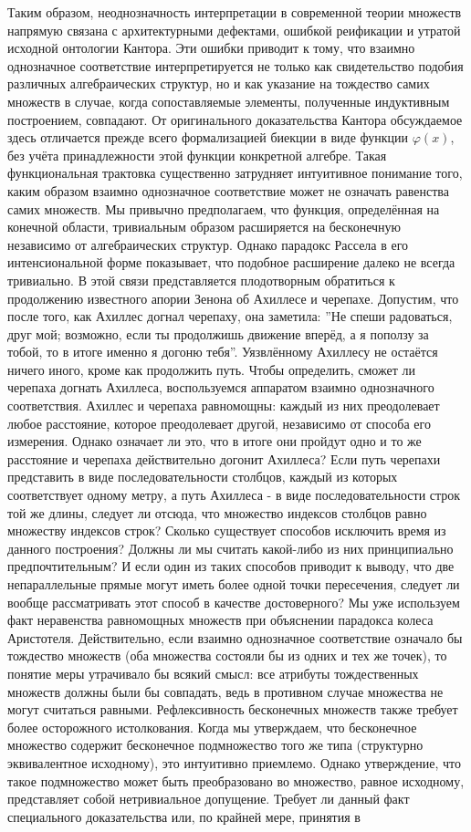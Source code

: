 \documentclass[12pt]{article}
\begin{document}
Таким образом, неоднозначность интерпретации в современной теории множеств напрямую связана с архитектурными дефектами, ошибкой реификации и утратой исходной онтологии Кантора. Эти ошибки приводит к тому, что взаимно однозначное соответствие интерпретируется не только как свидетельство подобия различных алгебраических структур, но и как указание на тождество самих множеств в случае, когда сопоставляемые элементы, полученные индуктивным построением, совпадают. От оригинального доказательства Кантора обсуждаемое здесь отличается прежде всего формализацией биекции в виде функции $\varphi(x)$, без учёта принадлежности этой функции конкретной алгебре. Такая функциональная трактовка существенно затрудняет интуитивное понимание того, каким образом взаимно однозначное соответствие может не означать равенства самих множеств. Мы привычно предполагаем, что функция, определённая на конечной области, тривиальным образом расширяется на бесконечную независимо от алгебраических структур. Однако парадокс Рассела в его интенсиональной форме показывает, что подобное расширение далеко не всегда тривиально. В этой связи представляется плодотворным обратиться к продолжению известного апории Зенона об Ахиллесе и черепахе. Допустим, что после того, как Ахиллес догнал черепаху, она заметила: ''Не спеши радоваться, друг мой; возможно, если ты продолжишь движение вперёд, а я поползу за тобой, то в итоге именно я догоню тебя''. Уязвлённому Ахиллесу не остаётся ничего иного, кроме как продолжить путь. Чтобы определить, сможет ли черепаха догнать Ахиллеса, воспользуемся аппаратом взаимно однозначного соответствия. Ахиллес и черепаха равномощны: каждый из них преодолевает любое расстояние, которое преодолевает другой, независимо от способа его измерения. Однако означает ли это, что в итоге они пройдут одно и то же расстояние и черепаха действительно догонит Ахиллеса? Если путь черепахи представить в виде последовательности столбцов, каждый из которых соответствует одному метру, а путь Ахиллеса - в виде последовательности строк той же длины, следует ли отсюда, что множество индексов столбцов равно множеству индексов строк? Сколько существует способов исключить время из данного построения? Должны ли мы считать какой-либо из них принципиально предпочтительным? И если один из таких способов приводит к выводу, что две непараллельные прямые могут иметь более одной точки пересечения, следует ли вообще рассматривать этот способ в качестве достоверного? Мы уже используем факт неравенства равномощных множеств при объяснении парадокса колеса Аристотеля. Действительно, если взаимно однозначное соответствие означало бы тождество множеств (оба множества состояли бы из одних и тех же точек), то понятие меры утрачивало бы всякий смысл: все атрибуты тождественных множеств должны были бы совпадать, ведь в противном случае множества не могут считаться равными. Рефлексивность бесконечных множеств также требует более осторожного истолкования. Когда мы утверждаем, что бесконечное множество содержит бесконечное подмножество того же типа (структурно эквивалентное исходному), это интуитивно приемлемо. Однако утверждение, что такое подмножество может быть преобразовано во множество, равное исходному, представляет собой нетривиальное допущение. Требует ли данный факт специального доказательства или, по крайней мере, принятия в 
\end{document}
